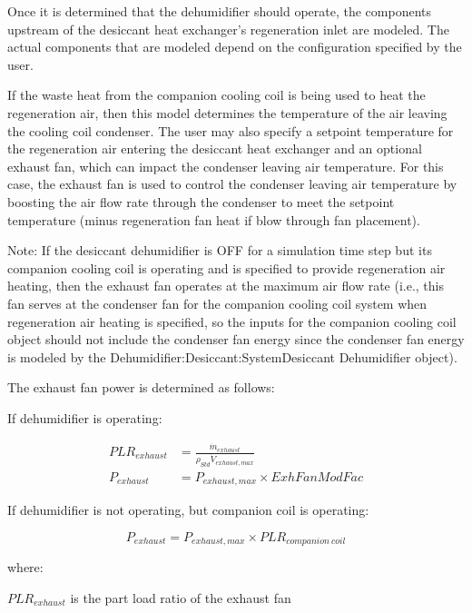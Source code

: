 Once it is determined that the dehumidifier should operate, the components upstream of the desiccant heat exchanger's regeneration inlet are modeled. The actual components that are modeled depend on the configuration specified by the user.

If the waste heat from the companion cooling coil is being used to heat the regeneration air, then this model determines the temperature of the air leaving the cooling coil condenser. The user may also specify a setpoint temperature for the regeneration air entering the desiccant heat exchanger and an optional exhaust fan, which can impact the condenser leaving air temperature. For this case, the exhaust fan is used to control the condenser leaving air temperature by boosting the air flow rate through the condenser to meet the setpoint temperature (minus regeneration fan heat if blow through fan placement).

Note: If the desiccant dehumidifier is OFF for a simulation time step but its companion cooling coil is operating and is specified to provide regeneration air heating, then the exhaust fan operates at the maximum air flow rate (i.e., this fan serves at the condenser fan for the companion cooling coil system when regeneration air heating is specified, so the inputs for the companion cooling coil object should not include the condenser fan energy since the condenser fan energy is modeled by the Dehumidifier:Desiccant:SystemDesiccant Dehumidifier object).

The exhaust fan power is determined as follows:

If dehumidifier is operating:

\begin{equation}
  \begin{array}{rl}
    PLR_{exhaust} &= \frac{\dot{m}_{exhaust}}{\rho_{Std}\dot{V}_{exhaust,max}} \\
    P_{exhaust} &= P_{exhaust,max} \times ExhFanModFac
  \end{array}
\end{equation}

If dehumidifier is not operating, but companion coil is operating:

\begin{equation}
  P_{exhaust} = P_{exhaust,max} \times PLR_{companion~coil}
\end{equation}

where:

\(PL{R_{exhaust}}\) is the part load ratio of the exhaust fan

